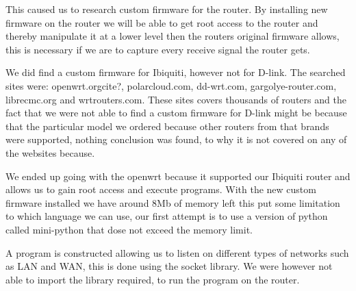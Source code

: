 This caused us to research custom firmware for the router. By installing new firmware on the router we will be able to get root access to the router and thereby manipulate it at a lower level then the routers original firmware allows, this is necessary if we are to capture every receive signal the router gets.

We did find a custom firmware for Ibiquiti, however not for D-link. The searched sites were: openwrt.org{cite?}, polarcloud.com, dd-wrt.com, gargolye-router.com, librecmc.org and wrtrouters.com. These sites covers thousands of routers and the fact that we were not able to find a custom firmware for D-link might be because that the particular model we ordered because other routers from that brands were supported, nothing conclusion was found, to why it is not covered on any of the websites because.

We ended up going with the openwrt because it supported our Ibiquiti router and allows us to gain root access and execute programs. With the new custom firmware installed we have around 8Mb of memory left this put some limitation to which language we can use, our first attempt is to use a version of python called mini-python that dose not exceed the memory limit.

A program is constructed allowing us to listen on different types of networks such as LAN and WAN, this is done using the socket library. We were however not able to import the library required, to run the program on the router.